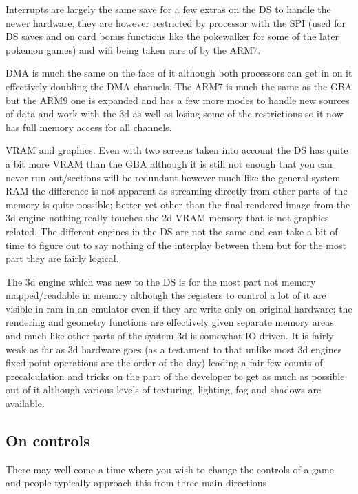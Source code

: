 \documentclass[
]{book}
\begin{document}
Interrupts are largely the same save for a few extras on the DS to handle the newer hardware, they are however restricted by processor with the SPI (used for DS saves and on card bonus functions like the pokewalker for some of the later pokemon games) and wifi being taken care of by the ARM7.

DMA is much the same on the face of it although both processors can get in on it effectively doubling the DMA channels. The ARM7 is much the same as the GBA but the ARM9 one is expanded and has a few more modes to handle new sources of data and work with the 3d as well as losing some of the restrictions so it now has full memory access for all channels.

VRAM and graphics. Even with two screens taken into account the DS has quite a bit more VRAM than the GBA although it is still not enough that you can never run out/sections will be redundant however much like the general system RAM the difference is not apparent as streaming directly from other parts of the memory is quite possible; better yet other than the final rendered image from the 3d engine nothing really touches the 2d VRAM memory that is not graphics related. The different engines in the DS are not the same and can take a bit of time to figure out to say nothing of the interplay between them but for the most part they are fairly logical.

The 3d engine which was new to the DS is for the most part not memory mapped/readable in memory although the registers to control a lot of it are visible in ram in an emulator even if they are write only on original hardware; the rendering and geometry functions are effectively given separate memory areas and much like other parts of the system 3d is somewhat IO driven. It is fairly weak as far as 3d hardware goes (as a testament to that unlike most 3d engines fixed point operations are the order of the day) leading a fair few counts of precalculation and tricks on the part of the developer to get as much as possible out of it although various levels of texturing, lighting, fog and shadows are available.

\hypertarget{on-controls}{%
\subsection{On controls}\label{on-controls}}

There may well come a time where you wish to change the controls of a game and people typically approach this from three main directions
\end{document}
